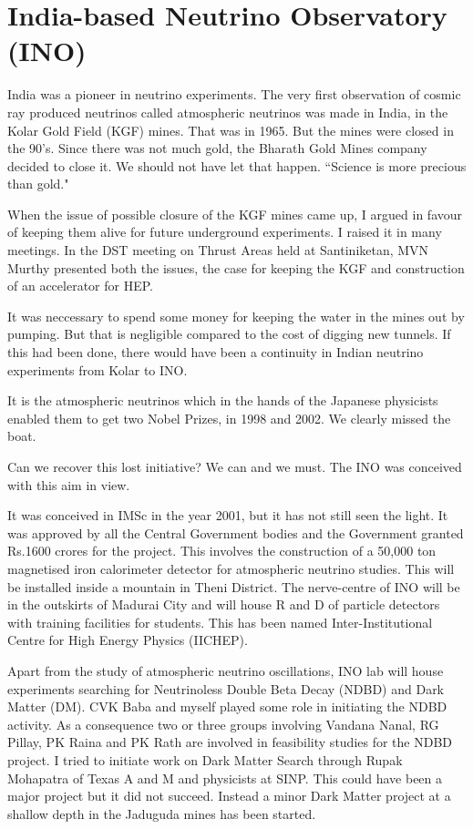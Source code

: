 \vspace{-.3cm}
\section*{India-based Neutrino Observatory (INO)}

\vspace{-.2cm}

India was a pioneer in neutrino experiments. The very first obser\-vation 
of cosmic ray produced neutrinos called atmospheric neutrinos was made 
in India, in the Kolar Gold Field (KGF) mines. That was in 1965. But the 
mines were closed in the 90's. Since there was not much gold, the 
Bharath Gold Mines company decided to close it. We should not have let 
that happen. ``Science is more precious than gold."


When the issue of possible closure of the KGF mines came up, I argued in 
favour of keeping them alive for future underground experiments. I 
raised it in many meetings. In the DST meeting on Thrust Areas held at 
Santiniketan, MVN Murthy presented both the issues, the case for keeping 
the KGF and construction of an accelerator for HEP.


It was neccessary to spend some money for keeping the water in the mines 
out by pumping. But that is negligible compared to the cost of digging 
new tunnels. If this had been done, there would have been a continuity 
in Indian neutrino experiments from Kolar to INO.


It is the atmospheric neutrinos which in the hands of the Japanese 
physicists enabled them to get two Nobel Prizes, in 1998 and 2002. We 
clearly missed the boat.


Can we recover this lost initiative? We can and we must. The INO was 
conceived with this aim in view.


It was conceived in IMSc in the year 2001, but it has not still seen the 
light. It was approved by all the Central Government bodies and the 
Government granted Rs.1600 crores for the pro\-ject. This involves the 
construction of a 50,000 ton magnetised iron calorimeter detector for 
atmospheric neutrino studies. This will be installed inside a mountain 
in Theni District. The nerve-centre of INO will be in the outskirts of 
Madurai City and will house R and D of particle detectors with training 
facilities for students. This has been named Inter-Institutional Centre 
for High Energy Physics (IICHEP).

\vskip 1pt
Apart from the study of atmospheric neutrino oscillations, INO lab will 
house experiments searching for Neutrinoless Double Beta Decay (NDBD) 
and Dark Matter (DM). CVK Baba and myself played some role in initiating 
the NDBD activity. As a consequence two or three groups involving 
Vandana Nanal, RG Pillay, PK Raina and PK Rath are involved in 
feasibility studies for the NDBD project. I tried to initiate work on 
Dark Matter Search through Rupak Mohapatra of Texas A and M and 
physicists at SINP. This could have been a major project but it did not 
succeed. Instead a minor Dark Matter project at a shallow depth in the 
Jaduguda mines has been started.


